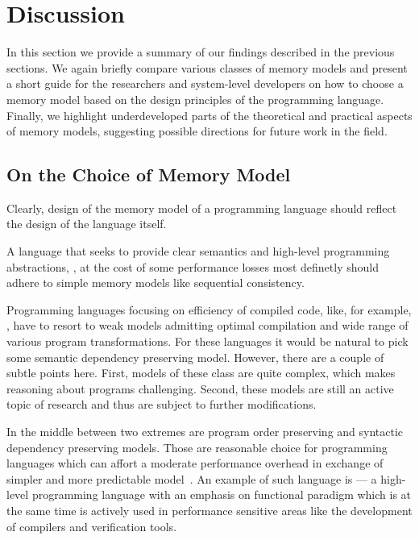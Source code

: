 \section{Discussion}
\label{sec:discussion}

In this section we provide a summary of our findings described in the previous sections. 
We again briefly compare various classes of memory models 
and present a short guide for the researchers and system-level developers 
on how to choose a memory model based 
on the design principles of the programming language.   
Finally, we highlight underdeveloped parts of the theoretical
and practical aspects of memory models, suggesting 
possible directions for future work in the field. 

\subsection{On the Choice of  Memory Model}

Clearly, design of the memory model of a programming language
should reflect the design of the language itself. 

A language that seeks to provide clear semantics and 
high-level programming abstractions, \eg \Haskell, at the cost 
of some performance losses most definetly should 
adhere to simple memory models like sequential consistency. 

Programming languages focusing on efficiency 
of compiled code, like, for example, \CPP, 
have to resort to weak models admitting 
optimal compilation and wide range of 
various program transformations. 
For these languages it would be natural 
to pick some semantic dependency preserving model. 
However, there are a couple of subtle points here. 
First, models of these class are quite complex, 
which makes reasoning about programs challenging. 
Second, these models are still an active topic 
of research and thus are subject to further modifications.

In the middle between two extremes are program order preserving and 
syntactic dependency preserving models.
Those are reasonable choice for programming languages
which can affort a moderate performance overhead 
in exchange of simpler and more predictable model~\cite{Ou-Demsky:OOPSLA18}.
An example of such language is \OCaml --- 
a high-level programming language 
with an emphasis on functional paradigm which is 
at the same time is actively used in performance sensitive areas
like the development of compilers and verification tools. 

